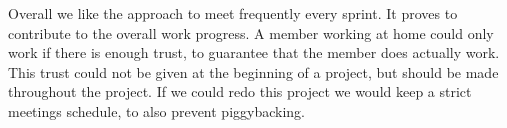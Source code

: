 Overall we like the approach to meet frequently every sprint. It proves to contribute to the overall work progress. A member working at home could only work if there is enough trust, to guarantee that the member does actually work. This trust could not be given at the beginning of a project, but should be made throughout the project. If we could redo this project we would keep a strict meetings schedule, to also prevent piggybacking.




